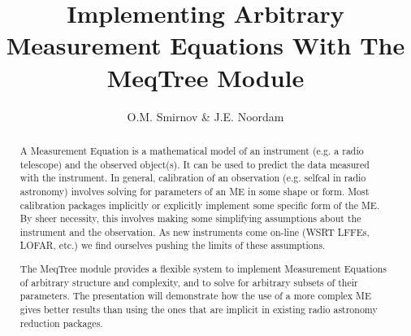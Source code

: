 \documentclass[11pt,twoside]{article}  %
\begin{document}



\title{Implementing Arbitrary Measurement Equations With The MeqTree Module}

\author{O.M. Smirnov \& J.E. Noordam}




%
%

\keywords{  }

\begin{abstract}           

A Measurement Equation is a mathematical model of an instrument (e.g. a radio
telescope) and the observed object(s). It can be used to predict  the data
measured with the instrument. In general, calibration of an observation (e.g.
selfcal in radio astronomy) involves solving for parameters of an ME in some
shape or form. Most calibration packages implicitly or explicitly implement some
specific form of the ME. By sheer necessity, this involves making some
simplifying assumptions about the instrument and the observation. As new
instruments come on-line (WSRT LFFEs, LOFAR, etc.) we find ourselves pushing the
limits of these assumptions.

The MeqTree module provides a flexible system to implement Measurement Equations
of arbitrary structure and complexity, and to solve for arbitrary subsets of
their parameters. The presentation will demonstrate how the use of a more
complex ME gives better results than using the ones that are implicit in
existing radio astronomy reduction packages.

\end{abstract}
\end{document}
